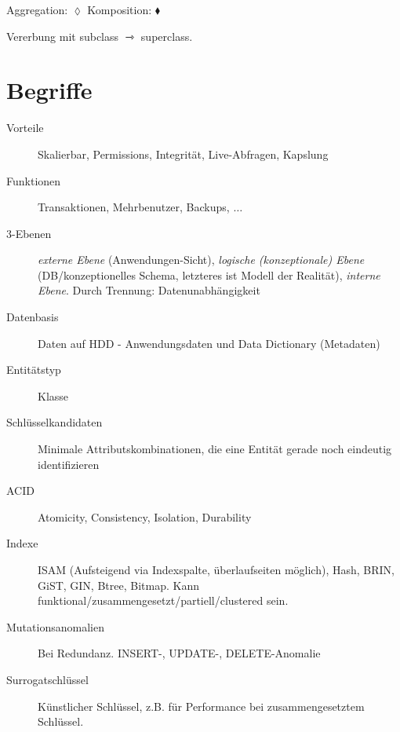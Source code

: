 \begin{multicols*}{3}
Aggregation: $\lozenge$ Komposition: $\blacklozenge $

Vererbung mit subclass {\huge$\rightarrowtriangle$} superclass.

\section{Begriffe}

\begin{description}
\item[Vorteile]{Skalierbar, Permissions, Integrität, Live-Abfragen, Kapslung}
\item[Funktionen]{Transaktionen, Mehrbenutzer, Backups, $\ldots$}
\item[3-Ebenen]{\emph{externe Ebene} (Anwendungen-Sicht), \emph{logische (konzeptionale) Ebene}
    (DB/konzeptionelles Schema, letzteres ist Modell der Realität), \emph{interne
    Ebene}. Durch Trennung: Datenunabhängigkeit}
\item[Datenbasis]{Daten auf HDD - Anwendungsdaten und Data Dictionary (Metadaten)}
\item[Entitätstyp]{Klasse}
\item[Schlüsselkandidaten]{Minimale Attributskombinationen, die eine Entität
    gerade noch eindeutig identifizieren}
\item[ACID]{Atomicity, Consistency, Isolation, Durability}
\item[Indexe]{ISAM (Aufsteigend via Indexspalte, überlaufseiten möglich), Hash, BRIN, GiST, GIN, Btree, Bitmap. Kann funktional/zusammengesetzt/partiell/clustered sein.}
\item[Mutationsanomalien]{Bei Redundanz. INSERT-, UPDATE-, DELETE-Anomalie}
\item[Surrogatschlüssel]{Künstlicher Schlüssel, z.B. für Performance bei
    zusammengesetztem Schlüssel}.
\end{description}


\end{multicols*}

